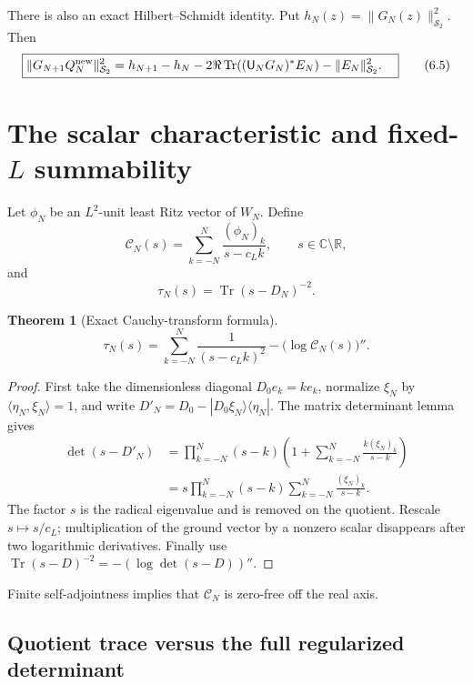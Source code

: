 \documentclass[11pt]{amsart}
\newtheorem{theorem}{Theorem}[section]
\theoremstyle{definition}
\theoremstyle{remark}
\newcommand{\C}{\mathbb C}
\newcommand{\R}{\mathbb R}
\newcommand{\Schatten}{\mathcal S}
\newcommand{\Tr}{\operatorname{Tr}}
\begin{document}
There is also an exact Hilbert--Schmidt identity.  Put
\(h_N(z)=\|G_N(z)\|_{\Schatten_2}^2\).  Then
\[
\boxed{
\begin{aligned}
\|G_{N+1}Q_N^{\rm new}\|_{\Schatten_2}^2
={}&h_{N+1}-h_N
-2\Re\Tr((\mathsf U_NG_N)^*E_N)-\|E_N\|_{\Schatten_2}^2.
\end{aligned}}
\tag{6.5}
\]

\section{The scalar characteristic and fixed-\texorpdfstring{\(L\)}{L}
summability}
\label{sec:summability}

Let \(\phi_N\) be an \(L^2\)-unit least Ritz vector of \(W_N\).  Define
\[
 \mathcal C_N(s)=\sum_{k=-N}^{N}\frac{(\phi_N)_k}{s-c_Lk},
 \qquad s\in\C\setminus\R,
\tag{7.1}
\]
and
\[
 \tau_N(s)=\Tr(s-D_N)^{-2}.
\tag{7.2}
\]

\begin{theorem}[Exact Cauchy-transform formula]
\[
\boxed{
 \tau_N(s)=\sum_{k=-N}^{N}\frac{1}{(s-c_Lk)^2}
            -\bigl(\log\mathcal C_N(s)\bigr)''.}
\tag{7.3}
\]
\end{theorem}

\begin{proof}
First take the dimensionless diagonal \(D_0e_k=ke_k\), normalize
\(\xi_N\) by \(\langle\eta_N,\xi_N\rangle=1\), and write
\(D'_N=D_0-|D_0\xi_N\rangle\langle\eta_N|\).  The matrix determinant
lemma gives
\[
\begin{aligned}
\det(s-D'_N)
&=\prod_{k=-N}^{N}(s-k)
  \left(1+\sum_{k=-N}^{N}\frac{k(\xi_N)_k}{s-k}\right)\\
&=s\prod_{k=-N}^{N}(s-k)
  \sum_{k=-N}^{N}\frac{(\xi_N)_k}{s-k}.
\end{aligned}
\tag{7.4}
\]
The factor \(s\) is the radical eigenvalue and is removed on the quotient.
Rescale \(s\mapsto s/c_L\); multiplication of the ground vector by a
nonzero scalar disappears after two logarithmic derivatives.  Finally use
\(\Tr(s-D)^{-2}=-(\log\det(s-D))''\).
\end{proof}

Finite self-adjointness implies that \(\mathcal C_N\) is zero-free off the
real axis.

\subsection{Quotient trace versus the full regularized determinant}
\end{document}
